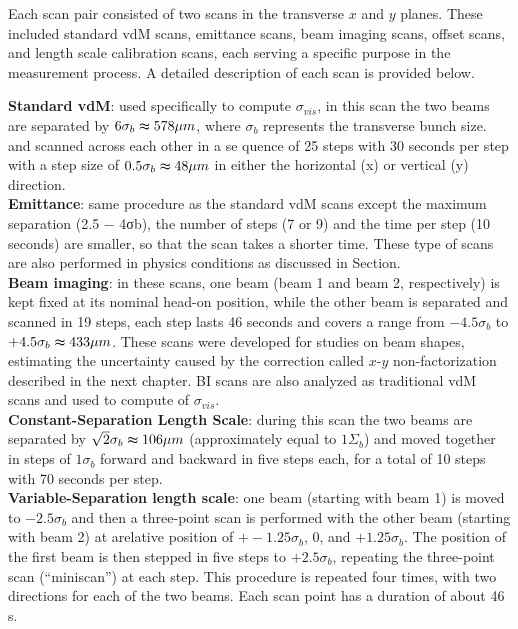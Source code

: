 Each scan pair consisted of two scans in the transverse \(x\) and \(y\) planes. These included standard vdM scans, emittance scans, beam imaging scans, offset scans, and length scale calibration scans, each serving a specific purpose in the measurement process. A detailed description of each scan is provided below.  

\noindent \textbf{Standard vdM}: used specifically to compute $\sigma_{vis}$, in this scan the two beams are separated by $6\sigma_{b} \thickapprox 578\mu m$, where $\sigma_{b}$ represents the transverse bunch size. and scanned across each other in a se quence of 25 steps with 30 seconds per step with a step size of $0.5\sigma_{b} \thickapprox 48 \mu m$ in either the horizontal (x) or vertical (y) direction.\\

\noindent \textbf{Emittance}: same procedure as the standard vdM scans except the maximum separation (2.5 − 4σb), the number of steps (7 or 9) and the time per step (10 seconds) are smaller, so that the scan takes a shorter time. These type of scans are also performed in physics conditions as discussed in Section.\\
 
\noindent \textbf{Beam imaging}: in these scans, one beam (beam 1 and beam 2, respectively) is kept fixed at its nominal head-on position, while the other beam is separated and scanned in 19 steps, each step lasts 46 seconds and covers a range from $-4.5\sigma_{b}$ to $+4.5\sigma_{b} \thickapprox 433 \mu m$. These scans were developed for studies on beam shapes, estimating the uncertainty caused by the correction called $x$-$y$ non-factorization described in the next chapter. BI scans are also analyzed as traditional vdM scans and used to compute of $\sigma_{vis}$.\\
 
\noindent \textbf{Constant-Separation Length Scale}: during this scan the two beams are separated by $\sqrt{2} \sigma_{b} \thickapprox 106 \mu m$ (approximately equal to $1 \Sigma_{b}$) and moved together in steps of $1\sigma_{b}$ forward and backward in five steps each, for a total of 10 steps with 70 seconds per step.\\

\noindent \textbf{Variable-Separation length scale}: one beam (starting with beam 1) is moved to $-2.5\sigma_{b}$ and then a three-point scan is performed with the other beam (starting with beam 2) at arelative position of $+-1.25\sigma_{b}$, 0, and $+1.25\sigma_{b}$. The position of the first beam is then stepped in five steps to $+2.5\sigma_{b}$, repeating the three-point scan (“miniscan”) at each step. This procedure is repeated four times, with two directions for each of the two beams. Each scan point has a duration of about 46 s.
 
